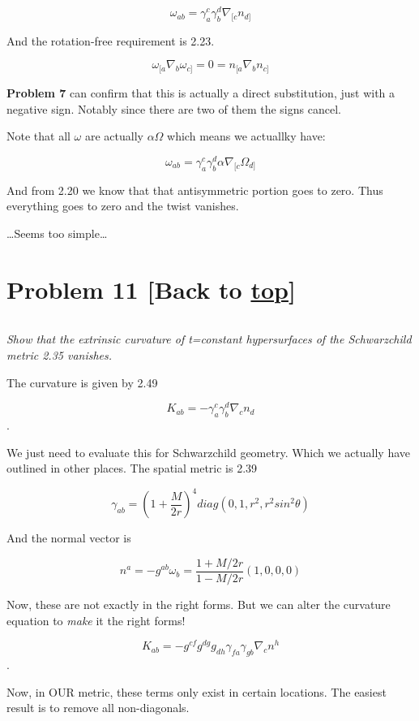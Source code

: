 \documentclass[landscape,letterpaper,10pt,english]{article}
\begin{document}
\[ \omega_{ab} = \gamma_a^c \gamma_b^d \nabla_{[c}n_{d]} \]

And the rotation-free requirement is 2.23.

\[\omega_{[a} \nabla_b \omega_{c]} = 0 = n_{[a} \nabla_b n_{c]} \]

\textbf{Problem 7} can confirm that this is actually a direct
substitution, just with a negative sign. Notably since there are two of
them the signs cancel.

    Note that all \(\omega\) are actually \(\alpha\Omega\) which means we
actuallky have:

\[ \omega_{ab} = \gamma_a^c \gamma_b^d \alpha \nabla_{[c}\Omega_{d]} \]

And from 2.20 we know that that antisymmetric portion goes to zero. Thus
everything goes to zero and the twist vanishes.

\ldots Seems too simple\ldots{}

    \hypertarget{problem-11-back-to-top}{%
\section{\texorpdfstring{Problem 11 {[}Back to
\hyperref[toc]{top}{]}}{Problem 11 {[}Back to {]}}}\label{problem-11-back-to-top}}

\[\label{P11}\]

\emph{Show that the extrinsic curvature of t=constant hypersurfaces of
the Schwarzchild metric 2.35 vanishes.}

    The curvature is given by 2.49

\[ K_{ab} = -\gamma^c_a\gamma^d_b\nabla_c n_d \].

We just need to evaluate this for Schwarzchild geometry. Which we
actually have outlined in other places. The spatial metric is 2.39

\[ \gamma_{ab} = \left( 1 + \frac{M}{2r}\right)^4 diag(0,1,r^2,r^2sin^2\theta) \]

And the normal vector is

\[ n^a = -g^{ab}\omega_b = \frac{1+M/2r}{1-M/2r}(1,0,0,0) \]

Now, these are not exactly in the right forms. But we can alter the
curvature equation to \emph{make} it the right forms!

    \[ K_{ab} = - g^{cf}g^{dg}g_{dh} \gamma_{fa}\gamma_{gb}\nabla_c n^h \].

    Now, in OUR metric, these terms only exist in certain locations. The
easiest result is to remove all non-diagonals.
\end{document}
